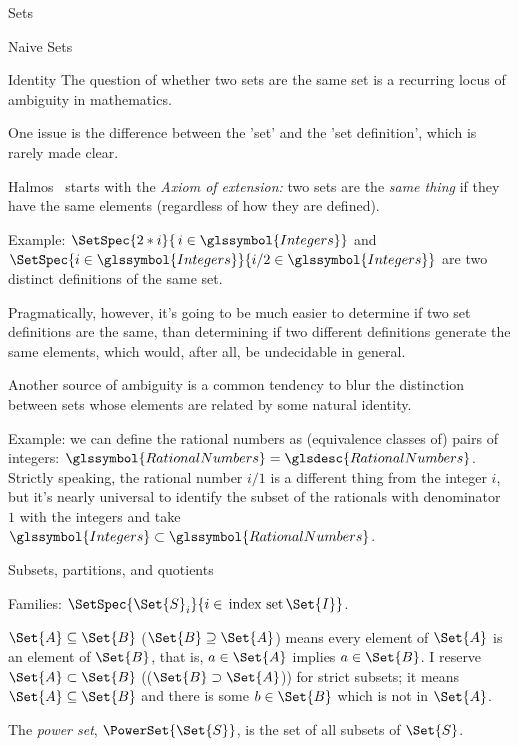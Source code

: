 \begin{plSection}{Sets}
\begin{plSection}{Naive Sets}
\begin{plSection}{Identity}
The question of whether two sets are the same set is a recurring
locus of ambiguity in mathematics.

One issue is the difference between the 'set' and the 
'set definition', which is rarely made clear.

Halmos~\cite{Halmos:1960:NaiveSetTheory} starts with the \emph{Axiom of
extension:} two sets are the \emph{same thing} if they have the
same elements (regardless of how they are defined).

Example: 
$\SetSpec{ 2*i }{ \, i \in \glssymbol{Integers} }$
and
$\SetSpec{ i \in \glssymbol{Integers} }
{ i/2 \in \glssymbol{Integers} }$
are two distinct definitions of the same set. 
 
Pragmatically, however, it's going to be much easier to determine
if two set definitions are the same, than determining if two
different definitions generate the same elements, which would,
after all, be undecidable in general.

Another source of ambiguity is a common tendency to blur the 
distinction between sets whose elements are related by some natural
identity. 

Example: we can define the rational numbers as (equivalence
classes of) pairs of integers:
$\glssymbol{RationalNumbers} = \glsdesc{RationalNumbers}$.
Strictly speaking, the rational number $i/1$ is a different thing
from the integer $i$, but it's nearly universal to identify the
subset of the rationals with denominator $1$ with the integers and
take $\glssymbol{Integers} \subset \glssymbol{RationalNumbers}$.
\end{plSection}%

\begin{plSection}{Subsets, partitions, and quotients}

Families: 
$\SetSpec{ \Set{S}_{i} }{ i \in \, \text{index set} \, \Set{I} }$.



$\Set{A} \subseteq \Set{B}$ ($\Set{B} \supseteq \Set{A}$)
means
every element of $\Set{A}$ is an element of $\Set{B}$, 
that is, $a \in \Set{A}$ 
implies $a \in \Set{B}$.
I reserve $\Set{A} \subset \Set{B}$ (($\Set{B} \supset
\Set{A}$)) for strict subsets;
it means $\Set{A} \subseteq \Set{B}$
and there is some $b\in\Set{B}$ which
is not in $\Set{A}$.


The \emph{power set}, $\PowerSet{\Set{S}}$,
 is the set 
of all subsets of
$\Set{S}$.


\end{plSection}
\end{plSection}
\end{plSection}
